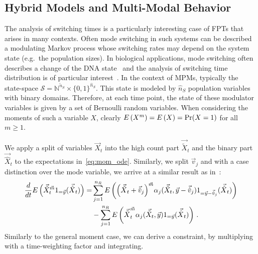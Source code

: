 \subsection{Hybrid Models and Multi-Modal Behavior}
The analysis of switching times is a particularly interesting case of FPTs that
arises in many   contexts.
Often mode switching in such systems can be described a modulating Markov process
whose switching rates may depend on the system state (e.g.\ the population sizes).
In biological applications, mode switching often describes a change of the
DNA state~\cite{hasenauer2014method,stekel2008strong} and the analysis of
switching time distribution is of particular interest~\cite{spieler2011model,barzel2008calculation}.
In the context of MPMs, typically the state-space $\mathcal{S}=
\mathbb{N}^{\tilde{n}_S}\times {\{0,1\}}^{\hat{n}_S}$.
This state is modeled by  $\hat{n}_S$ population variables with
binary domains. Therefore, at each time point, the state of these modulator variables
is given by a set of Bernoulli random variables.
When considering the moments of
such a variable $X$, clearly ${E}\left(X^m\right)={E}\left(X\right)=\Pr(X=1)$ for all $m\geq 1$.


We apply a  split of variables $\vec X_t$  into the high count part ${\vec{\tilde{X}}}_t$ and the binary
part ${\vec{\hat{X}}}_t$ to
the expectations in~\eqref{eq:mom_ode}. Similarly, we split   $\vec v_j$ and
with a case
distinction over the mode variable,
we arrive at a similar result as in~\cite{hasenauer2014method}:
\begin{equation}\label{eq:mcm}
\begin{split}
    \frac{d}{dt}{E}\left(\vec{\tilde{X}}^{{\vec m}}_t 1_{=\vec y}({\vec{\hat{X}}}_t)\right)
    =&\sum_{j=1}^{n_R}
        {E}\left({\left(
                {\vec{\tilde{{X}}}}_t+\vec{\tilde{{v}}}_j
            \right)}^{\vec{m}}\alpha_j(\vec{\tilde{{X}}}_t, \vec{{y}} -
            \vec{\hat{v}}_j)
            1_{={\vec{y}- \vec{\hat{v}}_j}}({\vec{\hat{X}}}_t )\right)\\
    &- \sum_{j=1}^{n_R}
    {E}\left({\vec{\tilde{{X}}}}_t^{\vec{m}}\alpha_j(\vec{\tilde{{X}}}_t,
                {\vec{y}})
            1_{=\vec y}({\vec{\hat{X}}}_t)\right)\,.
            \end{split}
\end{equation}
Similarly to the general moment case, we can derive a constraint, by multiplying with a time-weighting factor
and integrating.

